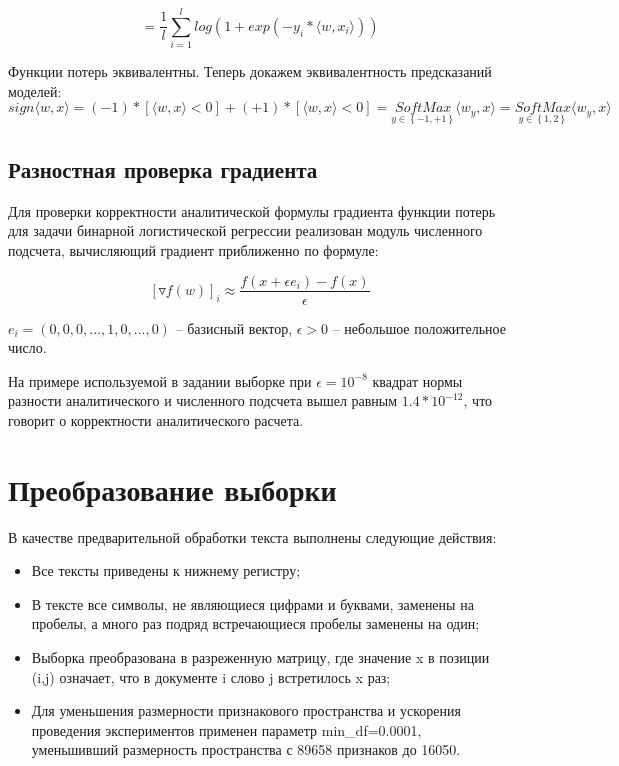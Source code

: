 \documentclass{article}
\begin{document}
$$=  \frac{1}{l}\sum_{i=1}^l log(1 + exp(-y_i*\langle w, x_i\rangle))$$

Функции потерь эквивалентны. Теперь докажем эквивалентность предсказаний моделей:
$$sign\langle w, x\rangle = (-1)* \left[ \langle w, x\rangle < 0\right] + (+1)* \left[ \langle w, x\rangle < 0\right] = {\underset{y\in\left\{-1, +1\right\}}{SoftMax}}\langle w_y, x\rangle = {\underset{y\in\left\{1, 2\right\}}{SoftMax}}\langle w_y, x\rangle$$


\subsection{Разностная проверка градиента}

Для проверки корректности аналитической формулы градиента функции потерь для задачи бинарной логистической регрессии реализован модуль численного подсчета, вычисляющий градиент приближенно по формуле:

$$\left[\triangledown f(w)\right]_i \approx\frac{f(x + \epsilon e_i) - f(x)}{\epsilon}$$

$e_i = (0, 0, 0, ..., 1, 0, ..., 0)$ – базисный вектор, $\epsilon > 0$ – небольшое положительное число.

На примере используемой в задании выборке при $\epsilon =10^{-8}$ квадрат нормы разности аналитического и численного подсчета вышел равным $1.4 * 10^{-12}$, что говорит о корректности аналитического расчета.


\section{Преобразование выборки}

В качестве предварительной обработки текста выполнены следующие действия:

\begin{itemize}
  \item Все тексты приведены к нижнему регистру;
  \item В тексте все символы, не являющиеся цифрами и буквами, заменены на пробелы, а много раз подряд встречающиеся пробелы заменены на один;
  \item Выборка преобразована в разреженную матрицу, где значение x в позиции (i,j) означает, что в документе i слово j встретилось x раз;
  \item Для уменьшения размерности признакового пространства и ускорения проведения экспериментов применен параметр min\_df=0.0001, уменьшивший размерность пространства с 89658 признаков до 16050.
\end{itemize}
\end{document}
